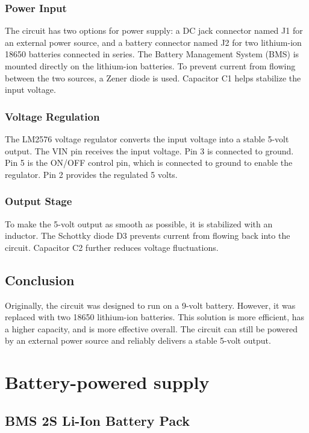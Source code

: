 \subsubsection*{Power Input}
The circuit has two options for power supply: a DC jack connector named J1 for an external power source, and a battery connector named J2 for two lithium-ion 18650 batteries connected in series. The Battery Management System (BMS) is mounted directly on the lithium-ion batteries. To prevent current from flowing between the two sources, a Zener diode is used. Capacitor C1 helps stabilize the input voltage.

\subsubsection*{Voltage Regulation}
The LM2576 voltage regulator converts the input voltage into a stable 5-volt output. The VIN pin receives the input voltage. Pin 3 is connected to ground. Pin 5 is the ON/OFF control pin, which is connected to ground to enable the regulator. Pin 2 provides the regulated 5 volts.

\subsubsection*{Output Stage}
To make the 5-volt output as smooth as possible, it is stabilized with an inductor. The Schottky diode D3 prevents current from flowing back into the circuit. Capacitor C2 further reduces voltage fluctuations.

\subsection*{Conclusion}
Originally, the circuit was designed to run on a 9-volt battery. However, it was replaced with two 18650 lithium-ion batteries. This solution is more efficient, has a higher capacity, and is more effective overall. The circuit can still be powered by an external power source and reliably delivers a stable 5-volt output.

\newpage

\section{Battery-powered supply}

\subsection{BMS 2S Li-Ion Battery Pack}

